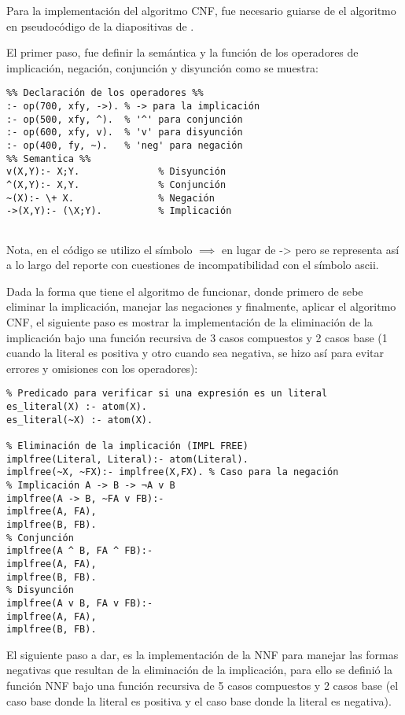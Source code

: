 \documentclass[11pt, letterpaper]{article}
\begin{document}
	Para la implementación del algoritmo CNF, fue necesario guiarse de el algoritmo en pseudocódigo de la diapositivas de \cite{Guerra2025}.
	
	El primer paso, fue definir la semántica y la función de los operadores de implicación, negación, conjunción y disyunción como se muestra:
	
	\begin{verbatim}
%% Declaración de los operadores %%
:- op(700, xfy, ->). % -> para la implicación
:- op(500, xfy, ^).  % '^' para conjunción
:- op(600, xfy, v).  % 'v' para disyunción
:- op(400, fy, ~).   % 'neg' para negación
%% Semantica %%
v(X,Y):- X;Y.              % Disyunción
^(X,Y):- X,Y.              % Conjunción
~(X):- \+ X.               % Negación
->(X,Y):- (\X;Y).          % Implicación
			
	\end{verbatim}
	
	Nota, en el código se utilizo el símbolo $\implies$ en lugar de -> pero se representa así a lo largo del reporte con cuestiones de incompatibilidad con el símbolo ascii.

\newpage
	
	Dada la forma que tiene el algoritmo de funcionar, donde primero de sebe eliminar la implicación, manejar las negaciones y finalmente, aplicar el algoritmo CNF, el siguiente paso es mostrar la implementación de la eliminación de la implicación bajo una función recursiva de 3 casos compuestos y 2 casos base (1 cuando la literal es positiva y otro cuando sea negativa, se hizo así para evitar errores y omisiones con los operadores):
	
	\begin{verbatim}
% Predicado para verificar si una expresión es un literal
es_literal(X) :- atom(X).
es_literal(~X) :- atom(X). 

% Eliminación de la implicación (IMPL FREE)
implfree(Literal, Literal):- atom(Literal).
implfree(~X, ~FX):- implfree(X,FX). % Caso para la negación
% Implicación A -> B -> ¬A v B
implfree(A -> B, ~FA v FB):-         
implfree(A, FA),
implfree(B, FB).
% Conjunción
implfree(A ^ B, FA ^ FB):-           
implfree(A, FA),
implfree(B, FB).
% Disyunción
implfree(A v B, FA v FB):-           
implfree(A, FA),
implfree(B, FB).
	\end{verbatim}
	
	\newpage
	
	El siguiente paso a dar, es la implementación de la NNF para manejar las formas negativas que resultan de la eliminación de la implicación, para ello se definió la función NNF bajo una función recursiva de 5 casos compuestos y 2 casos base (el caso base donde la literal es positiva y el caso base donde la literal es negativa).
	
\end{document}
